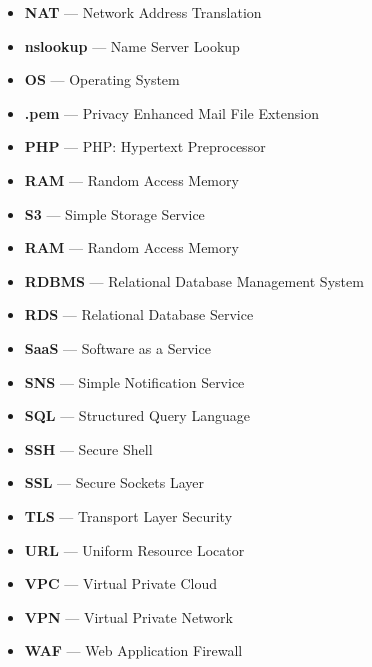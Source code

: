 \begin{itemize}
    \item  \textbf{NAT} — Network Address Translation
    \item  \textbf{nslookup} — Name Server Lookup
    \item  \textbf{OS} — Operating System
    \item  \textbf{.pem} — Privacy Enhanced Mail File Extension
    \item  \textbf{PHP} — PHP: Hypertext Preprocessor
    \item  \textbf{RAM} — Random Access Memory
    \item  \textbf{S3} — Simple Storage Service
    \item  \textbf{RAM} — Random Access Memory
    \item  \textbf{RDBMS} — Relational Database Management System
    \item  \textbf{RDS} — Relational Database Service
    \item  \textbf{SaaS} — Software as a Service
    \item  \textbf{SNS} — Simple Notification Service
    \item  \textbf{SQL} — Structured Query Language
    \item  \textbf{SSH} — Secure Shell
    \item  \textbf{SSL} — Secure Sockets Layer
    \item  \textbf{TLS} — Transport Layer Security
    \item  \textbf{URL} — Uniform Resource Locator
    \item  \textbf{VPC} — Virtual Private Cloud
    \item  \textbf{VPN} — Virtual Private Network
    \item  \textbf{WAF} — Web Application Firewall
\end{itemize}